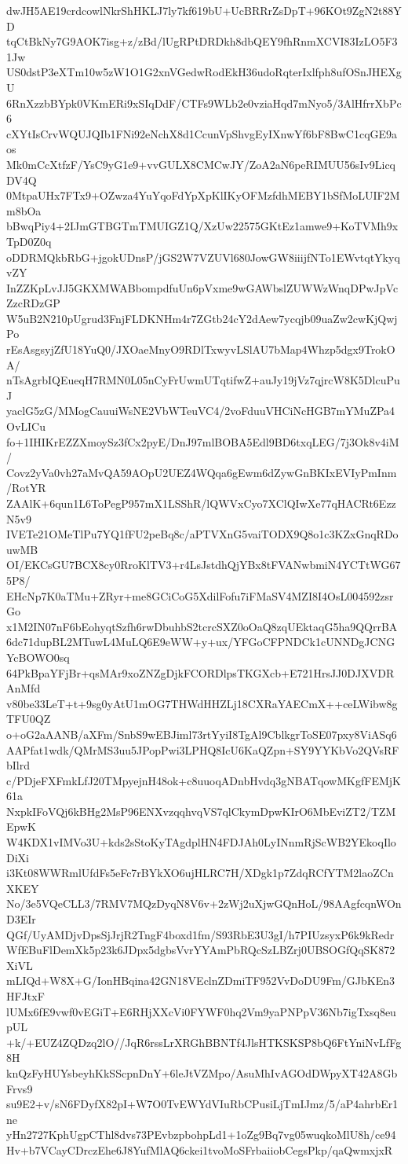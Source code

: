dwJH5AE19crdcowlNkrShHKLJ7ly7kf619bU+UcBRRrZsDpT+96KOt9ZgN2t88YD
tqCtBkNy7G9AOK7isg+z/zBd/lUgRPtDRDkh8dbQEY9fhRnmXCVI83IzLO5F31Jw
US0dstP3eXTm10w5zW1O1G2xnVGedwRodEkH36udoRqterIxlfph8ufOSnJHEXgU
6RnXzzbBYpk0VKmERi9xSIqDdF/CTFs9WLb2e0vziaHqd7mNyo5/3AlHfrrXbPc6
cXYtIsCrvWQUJQIb1FNi92eNchX8d1CcunVpShvgEyIXnwYf6bF8BwC1cqGE9aos
Mk0mCcXtfzF/YsC9yG1e9+vvGULX8CMCwJY/ZoA2aN6peRIMUU56sIv9LicqDV4Q
0MtpaUHx7FTx9+OZwza4YuYqoFdYpXpKlIKyOFMzfdhMEBY1bSfMoLUIF2Mm8bOa
bBwqPiy4+2IJmGTBGTmTMUIGZ1Q/XzUw22575GKtEz1amwe9+KoTVMh9xTpD0Z0q
oDDRMQkbRbG+jgokUDnsP/jGS2W7VZUVl680JowGW8iiijfNTo1EWvtqtYkyqvZY
InZZKpLvJJ5GKXMWABbompdfuUn6pVxme9wGAWbslZUWWzWnqDPwJpVcZzcRDzGP
W5uB2N210pUgrud3FnjFLDKNHm4r7ZGtb24cY2dAew7ycqjb09uaZw2cwKjQwjPo
rEsAsgsyjZfU18YuQ0/JXOaeMnyO9RDlTxwyvLSlAU7bMap4Whzp5dgx9TrokOA/
nTsAgrbIQEueqH7RMN0L05nCyFrUwmUTqtifwZ+auJy19jVz7qjrcW8K5DlcuPuJ
yaclG5zG/MMogCauuiWsNE2VbWTeuVC4/2voFduuVHCiNcHGB7mYMuZPa4OvLICu
fo+1IHIKrEZZXmoySz3fCx2pyE/DnJ97mlBOBA5Edl9BD6txqLEG/7j3Ok8v4iM/
Covz2yVa0vh27aMvQA59AOpU2UEZ4WQqa6gEwm6dZywGnBKIxEVIyPmInm/RotYR
ZAAlK+6qun1L6ToPegP957mX1LSShR/lQWVxCyo7XClQIwXe77qHACRt6EzzN5v9
IVETe21OMeTlPu7YQ1fFU2peBq8c/aPTVXnG5vaiTODX9Q8o1c3KZxGnqRDouwMB
OI/EKCsGU7BCX8cy0RroKlTV3+r4LsJstdhQjYBx8tFVANwbmiN4YCTtWG675P8/
EHcNp7K0aTMu+ZRyr+me8GCiCoG5XdilFofu7iFMaSV4MZI8I4OsL004592zsrGo
x1M2IN07nF6bEohyqtSzfh6rwDbuhbS2tcrcSXZ0oOaQ8zqUEktaqG5ha9QQrrBA
6dc71dupBL2MTuwL4MuLQ6E9eWW+y+ux/YFGoCFPNDCk1cUNNDgJCNGYcBOWO0sq
64PkBpaYFjBr+qsMAr9xoZNZgDjkFCORDlpsTKGXcb+E721HrsJJ0DJXVDRAnMfd
v80be33LeT+t+9sg0yAtU1mOG7THWdHHZLj18CXRaYAECmX++ceLWibw8gTFU0QZ
o+oG2aAANB/aXFm/SnbS9wEBJiml73rtYyiI8TgAl9CblkgrToSE07pxy8ViASq6
AAPfat1wdk/QMrMS3uu5JPopPwi3LPHQ8IcU6KaQZpn+SY9YYKbVo2QVsRFbIlrd
c/PDjeFXFmkLfJ20TMpyejnH48ok+c8uuoqADnbHvdq3gNBATqowMKgfFEMjK61a
NxpkIFoVQj6kBHg2MsP96ENXvzqqhvqVS7qlCkymDpwKIrO6MbEviZT2/TZMEpwK
W4KDX1vIMVo3U+kds2sStoKyTAgdplHN4FDJAh0LyINnmRjScWB2YEkoqIloDiXi
i3Kt08WWRmlUfdFs5eFc7rBYkXO6ujHLRC7H/XDgk1p7ZdqRCfYTM2laoZCnXKEY
No/3e5VQeCLL3/7RMV7MQzDyqN8V6v+2zWj2uXjwGQnHoL/98AAgfcqnWOnD3EIr
QGf/UyAMDjvDpsSjJrjR2TngF4boxd1fm/S93RbE3U3gI/h7PIUzsyxP6k9kRedr
WfEBuFlDemXk5p23k6JDpx5dgbsVvrYYAmPbRQcSzLBZrj0UBSOGfQqSK872XiVL
mLIQd+W8X+G/IonHBqina42GN18VEclnZDmiTF952VvDoDU9Fm/GJbKEn3HFJtxF
lUMx6fE9vwf0vEGiT+E6RHjXXcVi0FYWF0hq2Vm9yaPNPpV36Nb7igTxsq8eupUL
+k/+EUZ4ZQDzq2lO//JqR6rssLrXRGhBBNTf4JlsHTKSKSP8bQ6FtYniNvLfFg8H
knQzFyHUYsbeyhKkSScpnDnY+6leJtVZMpo/AsuMhIvAGOdDWpyXT42A8GbFrvs9
su9E2+v/sN6FDyfX82pI+W7O0TvEWYdVIuRbCPusiLjTmIJmz/5/aP4ahrbEr1ne
yHn2727KphUgpCThl8dvs73PEvbzpbohpLd1+1oZg9Bq7vg05wuqkoMlU8h/ce94
Hv+b7VCayCDrczEhe6J8YufMlAQ6ckei1tvoMoSFrbaiiobCegsPkp/qaQwmxjxR
